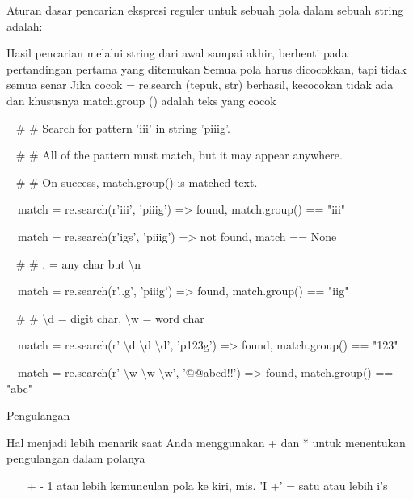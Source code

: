 \begin {enumerate}
\begin {enumerate}
\vspace{12pt}
\noindent
Aturan dasar pencarian ekspresi reguler untuk sebuah pola dalam sebuah string adalah: \par
\noindent
Hasil pencarian melalui string dari awal sampai akhir, berhenti pada pertandingan pertama yang ditemukan  Semua pola harus dicocokkan, tapi tidak semua senar Jika cocok = re.search (tepuk, str) berhasil, kecocokan tidak ada dan khususnya match.group () adalah teks yang cocok \par
\vspace{12pt}
\noindent
~  $  \#  $ $  \#  $ Search for pattern 'iii' in string 'piiig'. \par
\noindent
~  $  \#  $ $  \#  $ All of the pattern must match, but it may appear anywhere. \par
\noindent
~  $  \#  $ $  \#  $ On success, match.group() is matched text. \par
\noindent
~~match = re.search(r'iii', 'piiig') =>  found, match.group() == "iii" \par
\noindent
~~match = re.search(r'igs', 'piiig') =>  not found, match == None \par
\vspace{12pt}
\noindent
~  $  \#  $ $  \#  $ . = any char but  $  \setminus  $n \par
\noindent
~~match = re.search(r'..g', 'piiig') =>  found, match.group() == "iig" \par
\vspace{12pt}
\noindent
~  $  \#  $ $  \#  $  $  \setminus  $d = digit char,  $  \setminus  $w = word char \par
\noindent
~~match = re.search(r' $  \setminus  $d $  \setminus  $d $  \setminus  $d', 'p123g') =>  found, match.group() == "123" \par
\noindent
~~match = re.search(r' $  \setminus  $w $  \setminus  $w $  \setminus  $w', '@@abcd!!') =>  found, match.group() == "abc" \par
\vspace{12pt}
\vspace{12pt}
\noindent
Pengulangan \par
\vspace{12pt}
\noindent
Hal menjadi lebih menarik saat Anda menggunakan + dan * untuk menentukan pengulangan dalam polanya \par
\vspace{12pt}
\noindent
~~~ + - 1 atau lebih kemunculan pola ke kiri, mis. 'I +' = satu atau lebih i's \par

\end{enumerate}
\end{enumerate}

